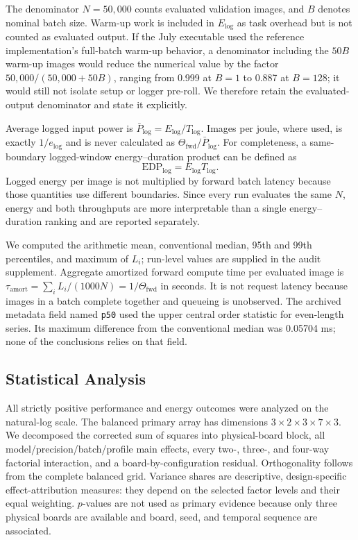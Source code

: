 \documentclass[electronics,article,submit,pdftex,moreauthors]{Definitions/mdpi}
\newcommand{\fwd}{\mathrm{fwd}}
\newcommand{\logwin}{\mathrm{log}}
\begin{document}
The denominator $N=50{,}000$ counts evaluated validation images, and $B$ denotes nominal batch size. Warm-up work is included in $E_{\logwin}$ as task overhead but is not counted as evaluated output. If the July executable used the reference implementation's full-batch warm-up behavior, a denominator including the $50B$ warm-up images would reduce the numerical value by the factor $50{,}000/(50{,}000+50B)$, ranging from 0.999 at $B=1$ to 0.887 at $B=128$; it would still not isolate setup or logger pre-roll. We therefore retain the evaluated-output denominator and state it explicitly.

Average logged input power is $\bar P_{\logwin}=E_{\logwin}/T_{\logwin}$. Images per joule, where used, is exactly $1/e_{\logwin}$ and is never calculated as $\Theta_{\fwd}/\bar P_{\logwin}$. For completeness, a same-boundary logged-window energy--duration product can be defined as
\begin{equation}
\mathrm{EDP}_{\logwin}=E_{\logwin}T_{\logwin}.
\end{equation}
Logged energy per image is not multiplied by forward batch latency because those quantities use different boundaries. Since every run evaluates the same $N$, energy and both throughputs are more interpretable than a single energy--duration ranking and are reported separately.

We computed the arithmetic mean, conventional median, 95th and 99th percentiles, and maximum of $L_i$; run-level values are supplied in the audit supplement. Aggregate amortized forward compute time per evaluated image is $\tau_{\mathrm{amort}}=\sum_i L_i/(1000N)=1/\Theta_{\fwd}$ in seconds. It is not request latency because images in a batch complete together and queueing is unobserved. The archived metadata field named \texttt{p50} used the upper central order statistic for even-length series. Its maximum difference from the conventional median was 0.05704 ms; none of the conclusions relies on that field.

\subsection{Statistical Analysis}

All strictly positive performance and energy outcomes were analyzed on the natural-log scale. The balanced primary array has dimensions $3\times2\times3\times7\times3$. We decomposed the corrected sum of squares into physical-board block, all model/precision/batch/profile main effects, every two-, three-, and four-way factorial interaction, and a board-by-configuration residual. Orthogonality follows from the complete balanced grid. Variance shares are descriptive, design-specific effect-attribution measures: they depend on the selected factor levels and their equal weighting. $p$-values are not used as primary evidence because only three physical boards are available and board, seed, and temporal sequence are associated.
\end{document}
